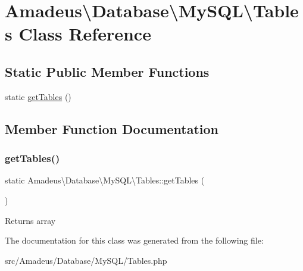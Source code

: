 \hypertarget{classAmadeus_1_1Database_1_1MySQL_1_1Tables}{}\section{Amadeus\textbackslash{}Database\textbackslash{}My\+S\+QL\textbackslash{}Tables Class Reference}
\label{classAmadeus_1_1Database_1_1MySQL_1_1Tables}
\subsection*{Static Public Member Functions}
\begin{DoxyCompactItemize}
\item 
static \hyperlink{classAmadeus_1_1Database_1_1MySQL_1_1Tables_a89a4f8d9f4f974e2a96f08a85ec42222}{get\+Tables} ()
\end{DoxyCompactItemize}


\subsection{Member Function Documentation}
\mbox{\label{classAmadeus_1_1Database_1_1MySQL_1_1Tables_a89a4f8d9f4f974e2a96f08a85ec42222}} 
\subsubsection{\texorpdfstring{get\+Tables()}{getTables()}}
{\footnotesize\ttfamily static Amadeus\textbackslash{}\+Database\textbackslash{}\+My\+S\+Q\+L\textbackslash{}\+Tables\+::get\+Tables (\begin{DoxyParamCaption}{ }\end{DoxyParamCaption})\hspace{0.3cm}{\ttfamily [static]}}

\begin{DoxyReturn}{Returns}
array 
\end{DoxyReturn}


The documentation for this class was generated from the following file\+:\begin{DoxyCompactItemize}
\item 
src/\+Amadeus/\+Database/\+My\+S\+Q\+L/Tables.\+php\end{DoxyCompactItemize}
